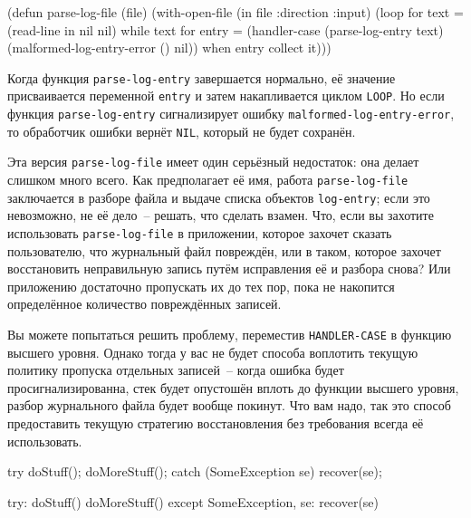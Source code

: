 \begin{myverb}
(defun parse-log-file (file)
  (with-open-file (in file :direction :input)
    (loop for text = (read-line in nil nil) while text
       for entry = (handler-case (parse-log-entry text)
                     (malformed-log-entry-error () nil))
       when entry collect it)))
\end{myverb}

Когда функция \lstinline{parse-log-entry} завершается нормально, её значение присваивается
переменной \lstinline{entry} и затем накапливается циклом \lstinline{LOOP}. Но если функция
\lstinline{parse-log-entry} сигнализирует ошибку \lstinline{malformed-log-entry-error}, то
обработчик ошибки вернёт \lstinline{NIL}, который не будет сохранён.

Эта версия \lstinline{parse-log-file} имеет один серьёзный недостаток: она делает слишком много
всего. Как предполагает её имя, работа \lstinline{parse-log-file} заключается в разборе файла и
выдаче списка объектов \lstinline{log-entry}; если это невозможно, не её дело~-- решать, что
сделать взамен. Что, если вы захотите использовать \lstinline{parse-log-file} в приложении,
которое захочет сказать пользователю, что журнальный файл повреждён, или в таком, которое
захочет восстановить неправильную запись путём исправления её и разбора снова? Или
приложению достаточно пропускать их до тех пор, пока не накопится определённое количество
повреждённых записей.

Вы можете попытаться решить проблему, переместив \lstinline{HANDLER-CASE} в функцию высшего
уровня. Однако тогда у вас не будет способа воплотить текущую политику пропуска отдельных
записей~-- когда ошибка будет просигнализированна, стек будет опустошён вплоть до функции
высшего уровня, разбор журнального файла будет вообще покинут. Что вам надо, так это
способ предоставить текущую стратегию восстановления без требования всегда её
использовать.

\vspace{0.8cm}

\begin{lrbox}{\chonenineone}
  \begin{minipage}{\linewidth}
\begin{myverb}
try {
  doStuff();
  doMoreStuff();
} catch (SomeException se) {
  recover(se);
}
\end{myverb} 
  \end{minipage}
\end{lrbox}

\begin{lrbox}{\choneninetwo}
  \begin{minipage}{\linewidth}
\begin{myverb}
try:
  doStuff()
  doMoreStuff()
except SomeException, se:
  recover(se)
\end{myverb} 
  \end{minipage}
\end{lrbox}

